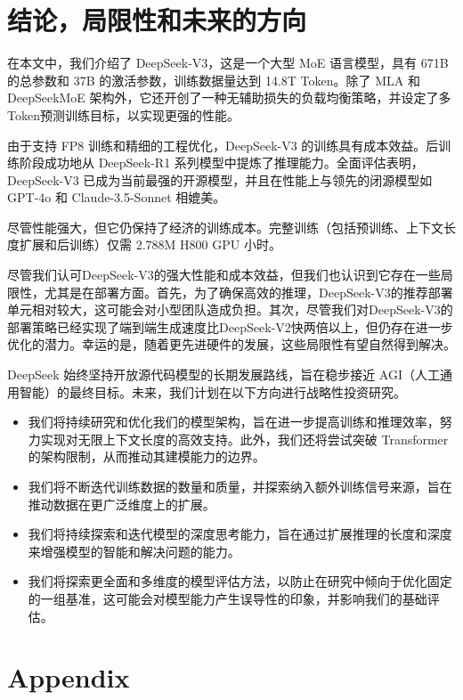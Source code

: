 \documentclass[lang=cn,a4paper,newtx]{elegantpaper}
\newcommand{\dsvii}{DeepSeek-V2}
\newcommand{\dsattn}{MLA}
\newcommand{\dsmoe}{DeepSeekMoE}
\newcommand{\dsviii}{DeepSeek-V3}
\begin{document}
\section{结论，局限性和未来的方向}
\label{sec:conclusion}

在本文中，我们介绍了 \dsviii{}，这是一个大型 MoE 语言模型，具有 671B 的总参数和 37B 的激活参数，训练数据量达到 14.8T Token。除了 \dsattn{} 和 \dsmoe{} 架构外，它还开创了一种无辅助损失的负载均衡策略，并设定了多Token预测训练目标，以实现更强的性能。

由于支持 FP8 训练和精细的工程优化，\dsviii{} 的训练具有成本效益。后训练阶段成功地从 DeepSeek-R1 系列模型中提炼了推理能力。全面评估表明，DeepSeek-V3 已成为当前最强的开源模型，并且在性能上与领先的闭源模型如 GPT-4o 和 Claude-3.5-Sonnet 相媲美。

尽管性能强大，但它仍保持了经济的训练成本。完整训练（包括预训练、上下文长度扩展和后训练）仅需 2.788M H800 GPU 小时。

尽管我们认可\dsviii{}的强大性能和成本效益，但我们也认识到它存在一些局限性，尤其是在部署方面。首先，为了确保高效的推理，\dsviii{}的推荐部署单元相对较大，这可能会对小型团队造成负担。其次，尽管我们对\dsviii{}的部署策略已经实现了端到端生成速度比\dsvii{}快两倍以上，但仍存在进一步优化的潜力。幸运的是，随着更先进硬件的发展，这些局限性有望自然得到解决。

DeepSeek 始终坚持开放源代码模型的长期发展路线，旨在稳步接近 AGI（人工通用智能）的最终目标。未来，我们计划在以下方向进行战略性投资研究。

\begin{itemize}
    \item 
    我们将持续研究和优化我们的模型架构，旨在进一步提高训练和推理效率，努力实现对无限上下文长度的高效支持。此外，我们还将尝试突破 Transformer 的架构限制，从而推动其建模能力的边界。
    \item 
    我们将不断迭代训练数据的数量和质量，并探索纳入额外训练信号来源，旨在推动数据在更广泛维度上的扩展。
    \item 
    我们将持续探索和迭代模型的深度思考能力，旨在通过扩展推理的长度和深度来增强模型的智能和解决问题的能力。
    \item 
    我们将探索更全面和多维度的模型评估方法，以防止在研究中倾向于优化固定的一组基准，这可能会对模型能力产生误导性的印象，并影响我们的基础评估。
\end{itemize}

\newpage
\appendix

\section*{Appendix}
\end{document}
